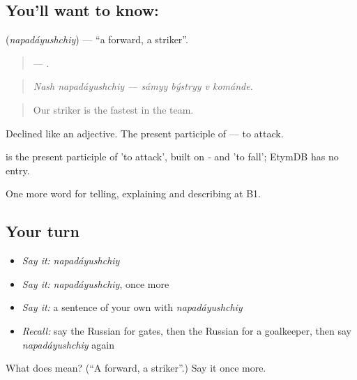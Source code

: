 \subsection*{You'll want to know: }
\textbf{} (\emph{napadáyushchiy}) — \textquotedblleft{}a forward, a striker\textquotedblright{}.

\begin{quote}
  —    .
\end{quote}

\begin{quote}
\emph{Nash napadáyushchiy — sámyy býstryy v kománde.}
\end{quote}

\begin{quote}
Our striker is the fastest in the team.
\end{quote}

Declined like an adjective. The present participle of \emph{} — to attack.

\begin{cousinweb}
\emph{} is the present participle of \emph{} 'to attack', built on \emph{-} and \emph{} 'to fall'; EtymDB has no entry.
\end{cousinweb}

\begin{grammarlens}[title={What you've built}]
One more word for telling, explaining and describing at B1.
\end{grammarlens}

\subsection*{Your turn}
\begin{itemize}
\raggedright
  \item \emph{Say it:} \emph{napadáyushchiy}
  \item \emph{Say it:} \emph{napadáyushchiy}, once more
  \item \emph{Say it:} a sentence of your own with \emph{napadáyushchiy}
  \item \emph{Recall:} say the Russian for gates, then the Russian for a goalkeeper, then say \emph{napadáyushchiy} again
\end{itemize}

\begin{tcolorbox}[breakable,colback=teal!4,colframe=teal!35!black,title={Before you move on}]
What does  mean? (\textquotedblleft{}A forward, a striker\textquotedblright{}.) Say it once more.
\end{tcolorbox}
